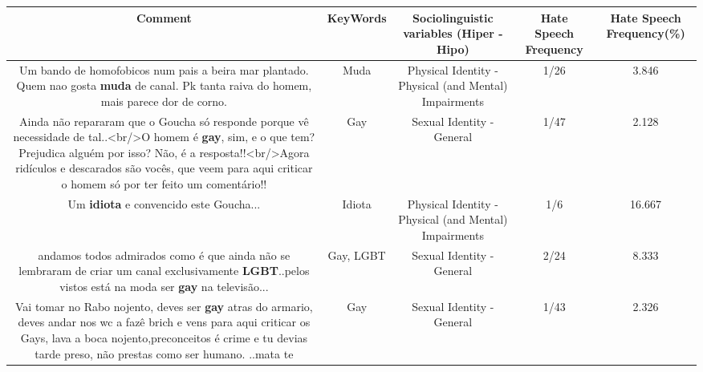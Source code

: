 \documentclass[11pt]{article}
\newlength\mylength
\begin{document}
\begin{center}
\setlength\mylength{\dimexpr\textwidth - 1\arrayrulewidth - 50\tabcolsep}
\begin{longtable}{|C{.65\mylength}|C{.30\mylength}|C{.12\mylength}|C{.12\mylength}|C{.12\mylength}|}
\hline
\textbf{Comment} & \textbf{KeyWords} & \textbf{Sociolinguistic variables (Hiper - Hipo)}  & \textbf{Hate Speech Frequency} & \textbf{Hate Speech Frequency(\%)} \\
\hline{}\small Um bando de homofobicos num pais a beira mar plantado. Quem nao gosta \textbf{muda} de canal. Pk tanta raiva do homem, mais parece dor de corno.\normalsize   & Muda & Physical Identity - Physical (and Mental) Impairments & 1/26 & 3.846 \\  \hline
  \small Ainda não repararam que o Goucha só responde porque vê necessidade de tal..<br/>O homem é \textbf{gay}, sim, e o que tem? Prejudica alguém por isso? Não, é a resposta!!<br/>Agora ridículos e descarados são vocês, que veem para aqui criticar o homem só por ter feito um comentário!!\normalsize   & Gay & Sexual Identity - General & 1/47 & 2.128 \\  \hline
  \small Um \textbf{idiota} e convencido este Goucha...\normalsize   & Idiota & Physical Identity - Physical (and Mental) Impairments & 1/6 & 16.667 \\  \hline
  \small andamos todos admirados como é que ainda não se lembraram de criar um canal exclusivamente \textbf{LGBT}..pelos vistos está na moda ser \textbf{gay} na televisão...\normalsize   & Gay, LGBT & Sexual Identity - General & 2/24 & 8.333 \\  \hline
  \small Vai tomar no Rabo nojento, deves ser \textbf{gay} atras do armario, deves andar nos wc a fazê brich e vens para aqui criticar os Gays, lava a boca nojento,preconceitos é crime e tu devias tarde preso, não prestas como ser humano. ..mata te\normalsize   & Gay & Sexual Identity - General & 1/43 & 2.326 \\  \hline
  
\end{longtable}
\end{center}
\end{document}
